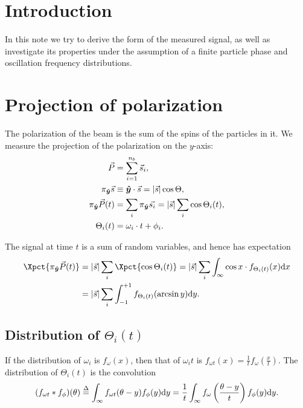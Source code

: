 \documentclass{article}
\newcommand{\nb}{{n_b}}
\newcommand{\uvec}[1]{\boldsymbol{\hat{#1}}}
\newcommand{\abs}[1]{\vert#1\vert}
\newcommand{\proj}[2]{\pi_{\uvec{#2}}\vec{#1}}
\newcommand{\deq}{\overset{\Delta}{=}}
\begin{document}
\section*{Introduction}
In this note we try to derive the form of the measured signal, as well as investigate its properties under the assumption of a finite particle phase and oscillation frequency distributions.

\section{Projection of polarization}
The polarization of the beam is the sum of the spins of the particles in it. We measure the projection of the polarization on the $y$-axis:
\begin{align}
	\vec{P} &= \sum_{i=1}^\nb \vec{s}_i, \notag\\
	\proj{s}{y} &\equiv \uvec{y}\cdot\vec{s} = \abs{\vec{s}}\cos\Theta, \notag\\
	\proj{P}{y}(t) &= \sum_i \proj{s_i}{y} = \abs{\vec{s}}\sum_i \cos\Theta_i(t), \label{eq:SumSpins}\\
	\Theta_i(t) &= \omega_i\cdot t + \phi_i.\notag
\end{align}

The signal at time $t$ is a sum of random variables, and hence has expectation 
\begin{align*}
	\Xpct{\proj{P}{y}(t)} &= \abs{\vec{s}}\sum_i\Xpct{\cos\Theta_i(t)} = \abs{\vec{s}}\sum_i\int_{\infty}\cos x \cdot f_{\Theta_i(t)}(x)\td x \\
	&= \abs{\vec{s}}\sum_i\int_{-1}^{+1} f_{\Theta_i(t)}(\arcsin y)\td y.
\end{align*}

\subsection{Distribution of $\Theta_i(t)$}
\newcommand{\f}[1]{f_{#1}}
\newcommand{\fw}{\f{\omega}}
\newcommand{\fp}{\f{\phi}}
\newcommand{\fwt}{\f{\omega t}}
\newcommand{\ftht}{\f{\Theta(t)}}

\newcommand{\wycoef}{G_6}
\newcommand{\dy}{\Delta\gamma}

If the distribution of $\omega_i$ is $\fw(x)$, then that of $\omega_i t$ is $\fwt(x) = \frac{1}{t}\fw(\frac{x}{t})$. The distribution of $\Theta_i(t)$ is the convolution 
\[
	(\fwt*\fp)(\theta) \deq \int_\infty \fwt(\theta-y)\fp(y)\td y = \frac1t \int_\infty \fw\bkt{\frac{\theta-y}{t}}\fp(y)\td y.
\]
\end{document}
